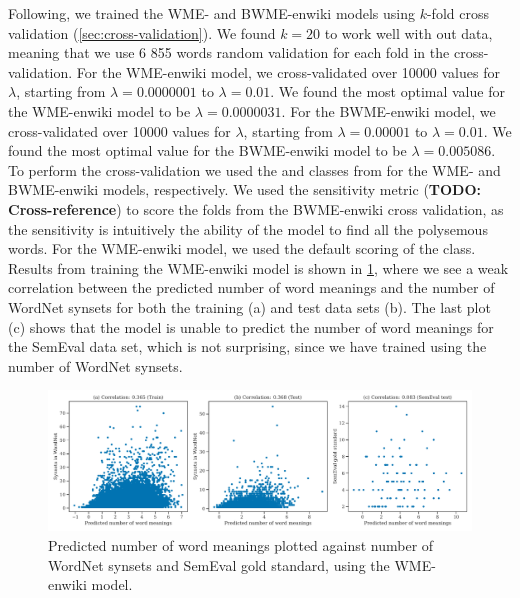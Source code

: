Following, we trained the WME- and BWME-enwiki models using $k$-fold cross validation (\cref{sec:cross-validation}). We found $k=20$ to work well with out data, meaning that we use 6 855 words random validation for each fold in the cross-validation. For the WME-enwiki model, we cross-validated over 10000 values for $\lambda$, starting from $\lambda=0.0000001$ to $\lambda=0.01$. We found the most optimal value for the WME-enwiki model to be $\lambda=0.0000031$. For the BWME-enwiki model, we cross-validated over 10000 values for $\lambda$, starting from $\lambda=0.00001$ to $\lambda=0.01$. We found the most optimal value for the BWME-enwiki model to be $\lambda=0.005086$. To perform the cross-validation we used the  and  classes from  for the WME- and BWME-enwiki models, respectively. We used the sensitivity metric (\textbf{TODO: Cross-reference}) to score the folds from the BWME-enwiki cross validation, as the sensitivity is intuitively the ability of the model to find all the polysemous words. For the WME-enwiki model, we used the default scoring of the  class. Results from training the WME-enwiki model is shown in \cref{fig:wme-enwiki-correlation-result}, where we see a weak correlation between the predicted number of word meanings and the number of WordNet synsets for both the training (a) and test data sets (b). The last plot (c) shows that the model is unable to predict the number of word meanings for the SemEval data set, which is not surprising, since we have trained using the number of WordNet synsets.
\begin{figure}[H]
    \centering
    \includegraphics[width=\textwidth]{thesis/figures/wme-enwiki-correlation-result.pdf}
    \caption{Predicted number of word meanings plotted against number of WordNet synsets and SemEval gold standard, using the WME-enwiki model.}
    \label{fig:wme-enwiki-correlation-result}
\end{figure}

